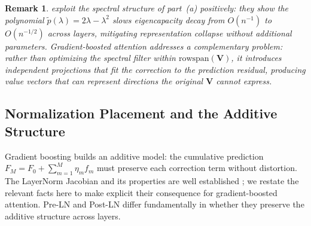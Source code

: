 \documentclass{article}
\newtheorem{remark}{Remark}
\theoremstyle{definition}
\begin{document}
\begin{remark}
\citet{abdullaev2025twicing} exploit the spectral structure of part~(a) positively: they show the polynomial $\tilde{p}(\lambda) = 2\lambda - \lambda^2$ slows eigencapacity decay from $O(n^{-1})$ to $O(n^{-1/2})$ across layers, mitigating representation collapse without additional parameters.
Gradient-boosted attention addresses a complementary problem: rather than optimizing the spectral filter within $\mathrm{rowspan}(\mathbf{V})$, it introduces independent projections that fit the correction to the prediction residual, producing value vectors that can represent directions the original $\mathbf{V}$ cannot express.
\end{remark}

\subsection{Normalization Placement and the Additive Structure}
\label{sec:normalization}

Gradient boosting builds an additive model: the cumulative prediction $F_M = F_0 + \sum_{m=1}^{M} \eta_m f_m$ must preserve each correction term without distortion.
The LayerNorm Jacobian and its properties are well established \citep{xiong2020layer}; we restate the relevant facts here to make explicit their consequence for gradient-boosted attention.
Pre-LN and Post-LN differ fundamentally in whether they preserve the additive structure across layers.
\end{document}

